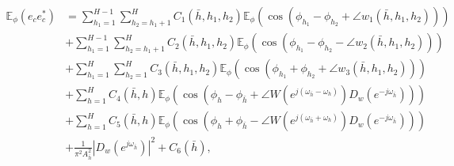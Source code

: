 \begin{equation}\label{phasevar0}
\begin{split}
\mathbb{E}_\phi\left(e_c e_c^*\right)&=\!\sum_{h_1=1}^{H-1} \sum_{h_2=h_1+1}^H \! C_1(\bar{h},h_1,h_2) \mathbb{E}_\phi\!\left(\cos(\phi_{h_1} \!-\! \phi_{h_2} \!+\!\angle w_1(\bar{h},h_1,h_2))\right)\\
&+ \!\sum_{h_1=1}^{H-1} \sum_{h_2=h_1+1}^H\!C_2(\bar{h},h_1,h_2)\mathbb{E}_\phi\!\left(\cos(\phi_{h_1} \!-\! \phi_{h_2} \!-\!\angle w_2(\bar{h},h_1,h_2))\right)\\
&+ \!\sum_{h_1=1}^H \sum_{h_2=1}^H\!C_3(\bar{h},h_1,h_2)\mathbb{E}_\phi\!\left(\cos(\phi_{h_1} \!+\! \phi_{h_2} \!+\!\angle w_3(\bar{h},h_1,h_2))\right)\\
&+\sum_{h=1}^H C_4(\bar{h},h)\mathbb{E}_\phi\left(\cos(\phi_h-\phi_{\bar{h}}+\angle W(e^{j(\omega_{\bar{h}}-\omega_h)})D_w(e^{-j\omega_{\bar{h}}}))\right)\\
&+\sum_{h=1}^H C_5(\bar{h},h)\mathbb{E}_\phi\left(\cos(\phi_h+\phi_{\bar{h}}-\angle W(e^{j(\omega_{\bar{h}}+\omega_h)})D_w(e^{-j\omega_{\bar{h}}}))\right)\\
&+\frac{1}{\pi^2A_{\bar{h}}^2}|D_w(e^{j\omega_{\bar{h}}})|^2 + C_6(\bar{h}),
\end{split}
\end{equation}
